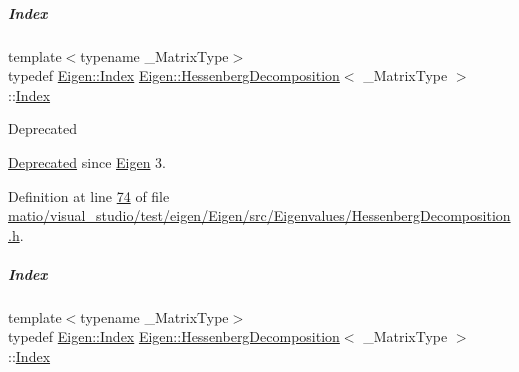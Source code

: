 \mbox{\label{group___eigenvalues___module_a8e287ac222f53e2c8ce82faa43e95ac6}} 
\subparagraph{\texorpdfstring{Index}{Index}\hspace{0.1cm}{\footnotesize\ttfamily [1/2]}}
{\footnotesize\ttfamily template$<$typename \+\_\+\+Matrix\+Type$>$ \\
typedef \hyperlink{namespace_eigen_a62e77e0933482dafde8fe197d9a2cfde}{Eigen\+::\+Index} \hyperlink{group___eigenvalues___module_class_eigen_1_1_hessenberg_decomposition}{Eigen\+::\+Hessenberg\+Decomposition}$<$ \+\_\+\+Matrix\+Type $>$\+::\hyperlink{group___eigenvalues___module_a8e287ac222f53e2c8ce82faa43e95ac6}{Index}}

\begin{DoxyRefDesc}{Deprecated}
\item[\hyperlink{deprecated__deprecated000064}{Deprecated}]since \hyperlink{namespace_eigen}{Eigen} 3. \end{DoxyRefDesc}


Definition at line \hyperlink{matio_2visual__studio_2test_2eigen_2_eigen_2src_2_eigenvalues_2_hessenberg_decomposition_8h_source_l00074}{74} of file \hyperlink{matio_2visual__studio_2test_2eigen_2_eigen_2src_2_eigenvalues_2_hessenberg_decomposition_8h_source}{matio/visual\+\_\+studio/test/eigen/\+Eigen/src/\+Eigenvalues/\+Hessenberg\+Decomposition.\+h}.

\mbox{\label{group___eigenvalues___module_a8e287ac222f53e2c8ce82faa43e95ac6}} 
\subparagraph{\texorpdfstring{Index}{Index}\hspace{0.1cm}{\footnotesize\ttfamily [2/2]}}
{\footnotesize\ttfamily template$<$typename \+\_\+\+Matrix\+Type$>$ \\
typedef \hyperlink{namespace_eigen_a62e77e0933482dafde8fe197d9a2cfde}{Eigen\+::\+Index} \hyperlink{group___eigenvalues___module_class_eigen_1_1_hessenberg_decomposition}{Eigen\+::\+Hessenberg\+Decomposition}$<$ \+\_\+\+Matrix\+Type $>$\+::\hyperlink{group___eigenvalues___module_a8e287ac222f53e2c8ce82faa43e95ac6}{Index}}

